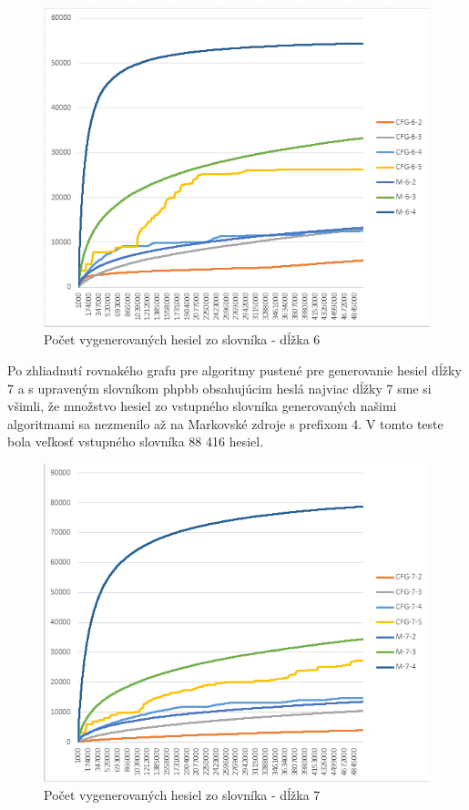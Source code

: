 \begin{figure}[h]
    \centering
    \includegraphics[width=1\textwidth]{Accuracy_6}
    \caption{Počet vygenerovaných hesiel zo slovníka - dĺžka 6}
    \label{fig:Acc6}
\end{figure}

Po zhliadnutí rovnakého grafu pre algoritmy pustené pre generovanie hesiel dĺžky 7 a s upraveným slovníkom phpbb obsahujúcim heslá najviac dĺžky 7 sme si všimli, že množstvo hesiel zo vstupného slovníka generovaných našimi algoritmami sa nezmenilo až na Markovské zdroje s prefixom 4. V tomto teste bola veľkosť vstupného slovníka 88 416 hesiel.

\begin{figure}[h]
    \centering
    \includegraphics[width=1\textwidth]{Accuracy_7}
    \caption{Počet vygenerovaných hesiel zo slovníka - dĺžka 7}
    \label{fig:Acc7}
\end{figure}

